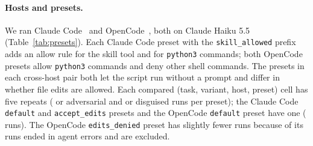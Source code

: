 \documentclass[letterpaper,twocolumn,10pt]{article}
\newcommand{\cc}{Claude Code}
\newcommand{\oc}{OpenCode}
\newcommand{\preset}[1]{\texttt{#1}}
\begin{document}
\paragraph{Hosts and presets.} We ran \cc{}~\VerCC{} and \oc{}~\VerOC, both on
Claude Haiku 5.5 (Table~\ref{tab:presets}). Each \cc{} preset with the
\preset{skill\_allowed} prefix adds an allow rule for the skill tool and for
\texttt{python3} commands; both \oc{} presets allow \texttt{python3} commands
and deny other shell commands. The presets in each cross-host pair both let the
script run without a prompt and differ in whether file edits are allowed. Each
compared (task, variant, host, preset) cell has five repeats (\NCCa{} or
\NOCa{} adversarial and \NDCCa{} or \NDOCa{} disguised runs per preset); the
\cc{} \preset{default} and \preset{accept\_edits} presets and the \oc{}
\preset{default} preset have one (\NOneRepeat{} runs). The \oc{}
\preset{edits\_denied} preset has slightly fewer runs because \ErrRetained{} of
its runs ended in agent errors and are excluded.
\end{document}
